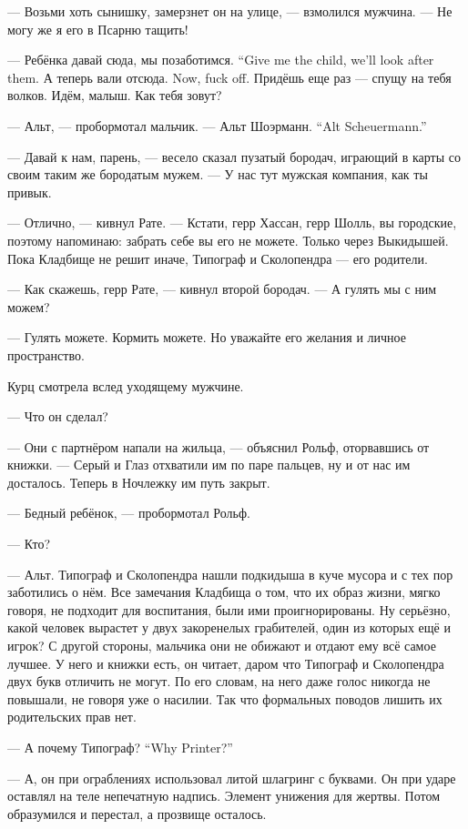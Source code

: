 --- Возьми хоть сынишку, замерзнет он на улице, --- взмолился мужчина.
--- Не могу же я его в Псарню тащить!

{--- Ребёнка давай сюда, мы позаботимся.}
{``Give me the child, we'll look after them.}
{А теперь вали отсюда.}
{Now, fuck off.}
Придёшь еще раз --- спущу на тебя волков.
Идём, малыш.
Как тебя зовут?

--- Альт, --- пробормотал мальчик.
{--- Альт Шоэрманн.}
{``Alt Scheuermann.''}

--- Давай к нам, парень, --- весело сказал пузатый бородач, играющий в карты со своим таким же бородатым мужем.
--- У нас тут мужская компания, как ты привык.

--- Отлично, --- кивнул Рате.
--- Кстати, герр Хассан, герр Шолль, вы городские, поэтому напоминаю: забрать себе вы его не можете.
Только через Выкидышей.
Пока Кладбище не решит иначе, Типограф и Сколопендра --- его родители.

--- Как скажешь, герр Рате, --- кивнул второй бородач.
--- А гулять мы с ним можем?

--- Гулять можете.
Кормить можете.
Но уважайте его желания и личное пространство.

Курц смотрела вслед уходящему мужчине.

--- Что он сделал?

--- Они с партнёром напали на жильца, --- объяснил Рольф, оторвавшись от книжки.
--- Серый и Глаз отхватили им по паре пальцев, ну и от нас им досталось.
Теперь в Ночлежку им путь закрыт.

--- Бедный ребёнок, --- пробормотал Рольф.

--- Кто?

--- Альт.
Типограф и Сколопендра нашли подкидыша в куче мусора и с тех пор заботились о нём.
Все замечания Кладбища о том, что их образ жизни, мягко говоря, не подходит для воспитания, были ими проигнорированы.
Ну серьёзно, какой человек вырастет у двух закоренелых грабителей, один из которых ещё и игрок?
С другой стороны, мальчика они не обижают и отдают ему всё самое лучшее.
У него и книжки есть, он читает, даром что Типограф и Сколопендра двух букв отличить не могут.
По его словам, на него даже голос никогда не повышали, не говоря уже о насилии.
Так что формальных поводов лишить их родительских прав нет.

{--- А почему Типограф?}
{``Why Printer?''}

--- А, он при ограблениях использовал литой шлагринг с буквами.
Он при ударе оставлял на теле непечатную надпись.
Элемент унижения для жертвы.
Потом образумился и перестал, а прозвище осталось.

